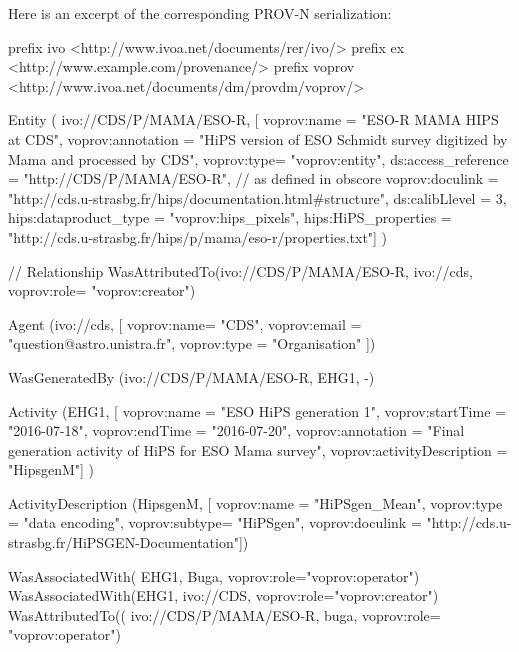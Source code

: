 Here is an excerpt of the corresponding PROV-N serialization:

\begin{verbnobox}[\scriptsize]
prefix ivo <http://www.ivoa.net/documents/rer/ivo/>
prefix ex <http://www.example.com/provenance/>
prefix voprov <http://www.ivoa.net/documents/dm/provdm/voprov/>

Entity
( ivo://CDS/P/MAMA/ESO-R, 
[ voprov:name = "ESO-R MAMA HIPS at CDS",
voprov:annotation = "HiPS version of ESO Schmidt survey digitized by Mama and processed by CDS",
voprov:type= "voprov:entity",
ds:access_reference = "http://CDS/P/MAMA/ESO-R", // as defined in obscore 
voprov:doculink = "http://cds.u-strasbg.fr/hips/documentation.html#structure",
ds:calibLlevel = 3,
hips:dataproduct_type = "voprov:hips_pixels",
hips:HiPS_properties = "http://cds.u-strasbg.fr/hips/p/mama/eso-r/properties.txt"] )

// Relationship
WasAttributedTo(ivo://CDS/P/MAMA/ESO-R, ivo://cds, voprov:role= "voprov:creator")

Agent
(ivo://cds,
[ voprov:name= "CDS",
voprov:email = "question@astro.unistra.fr",
voprov:type = "Organisation" ]) 

WasGeneratedBy  (ivo://CDS/P/MAMA/ESO-R, EHG1, -) 

Activity
(EHG1,
[ voprov:name = "ESO HiPS generation 1",
voprov:startTime = "2016-07-18", 
voprov:endTime = "2016-07-20",
voprov:annotation = "Final generation activity of HiPS for ESO Mama survey",
voprov:activityDescription = "HipsgenM"] )
 
ActivityDescription 
(HipsgenM,
[ voprov:name = "HiPSgen_Mean",
voprov:type = "data encoding",
voprov:subtype= "HiPSgen",
voprov:doculink = "http://cds.u-strasbg.fr/HiPSGEN-Documentation"])

WasAssociatedWith( EHG1, Buga, voprov:role="voprov:operator")
WasAssociatedWith(EHG1, ivo://CDS, voprov:role="voprov:creator")
WasAttributedTo(( ivo://CDS/P/MAMA/ESO-R, buga, voprov:role= "voprov:operator")
\end{verbnobox}
